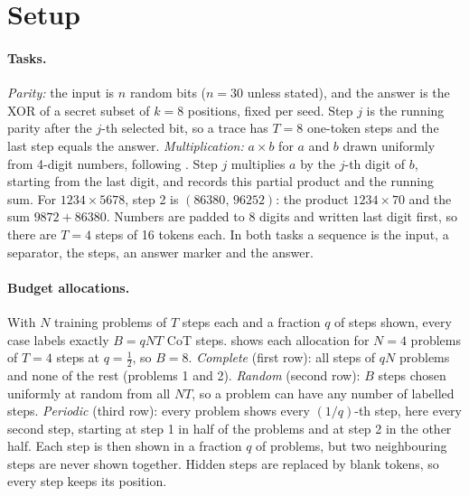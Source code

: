 \documentclass{article}
\newcommand{\Nprob}{N}      %
\newcommand{\Bud}{B}        %
\begin{document}
\section{Setup}
\label{sec:setup}

\paragraph{Tasks.}
\emph{Parity:} the input is $n$ random bits ($n=30$ unless stated), and the answer
is the XOR of a secret subset of $k=8$ positions, fixed per seed. Step $j$ is
the running parity after the $j$-th selected bit, so a trace has $T=8$
one-token steps and the last step equals the answer.
\emph{Multiplication:} $a\times b$ for $a$ and $b$ drawn uniformly from 4-digit
numbers, following \citet{lee2024teaching,deng2024explicit}. Step $j$
multiplies $a$ by the $j$-th digit of $b$, starting from the last digit, and
records this partial product and the running sum. For $1234\times5678$, step 2
is $(86380,\,96252)$: the product $1234\times70$ and the sum $9872+86380$. Numbers are padded to 8 digits and
written last digit first, so there are $T=4$ steps of 16 tokens each.
In both tasks a sequence is the input, a separator, the steps, an answer
marker and the answer.

\paragraph{Budget allocations.}
With $\Nprob$ training problems of $T$ steps each and a fraction $q$ of steps
shown, every case labels exactly $\Bud=q\Nprob T$ CoT steps.
 shows each allocation for $\Nprob=4$
problems of $T=4$ steps at $q=\tfrac12$, so $\Bud=8$.
\emph{Complete} (first row): all steps of $q\Nprob$ problems and none of the
rest (problems 1 and 2).
\emph{Random} (second row): $\Bud$ steps chosen uniformly at random from all
$\Nprob T$, so a problem can have any number of labelled steps.
\emph{Periodic} (third row): every problem shows every $(1/q)$-th step, here
every second step, starting at step 1 in half of the problems and at step 2
in the other half. Each step is then shown in a fraction $q$ of problems,
but two neighbouring steps are never shown together.
Hidden steps are replaced by blank tokens, so every step keeps its position.
\end{document}

